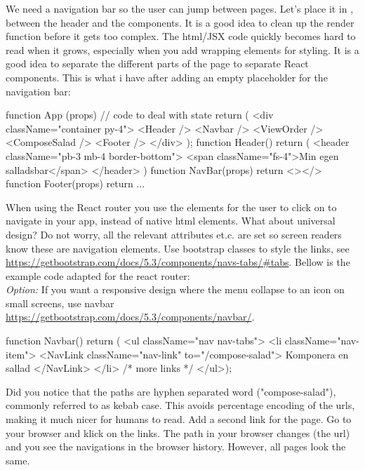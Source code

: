 \documentclass[fleqn, article, a4paper]{memoir}
\begin{document}
\begin{Assignments}
\item We need a navigation bar so the user can jump between pages. Let's place it in , between the header and the  components. It is a good idea to clean up the render function before it gets too complex. The html/JSX code quickly becomes hard to read when it grows, especially when you add wrapping  elements for styling. It is a good idea to separate the different parts of the page to separate React components. This is what i have after adding an empty placeholder for the navigation bar:

\begin{Code}
function App (props) {
  // code to deal with state
  return (
    <div className="container py-4">
        <Header />
        <Navbar />
        <ViewOrder />
        <ComposeSalad />
        <Footer />
    </div>
  );
}
function Header() {  return (
    <header className="pb-3 mb-4 border-bottom">
      <span className="fs-4">Min egen salladsbar</span>
    </header>
)}
function NavBar(props) { return <></> } 
function Footer(props) { return ... } 

\end{Code}

\noindent When using the React router you use the  elements for the user to click on to navigate in your app, instead of native  html elements. What about universal design? Do not worry, all the relevant  attributes et.c. are set so screen readers know these are navigation elements. Use bootstrap classes to style the links, see \url{https://getbootstrap.com/docs/5.3/components/navs-tabs/#tabs}. Bellow is the example code adapted for the react router:
\\ \emph{Option:} If you want a responsive design where the menu collapse to an icon on small screens, use navbar \url{https://getbootstrap.com/docs/5.3/components/navbar/}.

\begin{Code}
function Navbar() {
  return (
  <ul className="nav nav-tabs">
    <li className="nav-item">
      <NavLink className="nav-link" to="/compose-salad">
        Komponera en sallad
      </NavLink>
    </li>
    {/* more links */}
  </ul>);
}
\end{Code}
Did you notice that the paths are hyphen separated word ("compose-salad"), commonly referred to as kebab case. This avoids percentage encoding of the urls, making it much nicer for humans to read. Add a second link for the  page. Go to your browser and klick on the links. The path in your browser changes (the url) and you see the navigations in the browser history. However, all pages look the same.


\end{Assignments}
\end{document}
